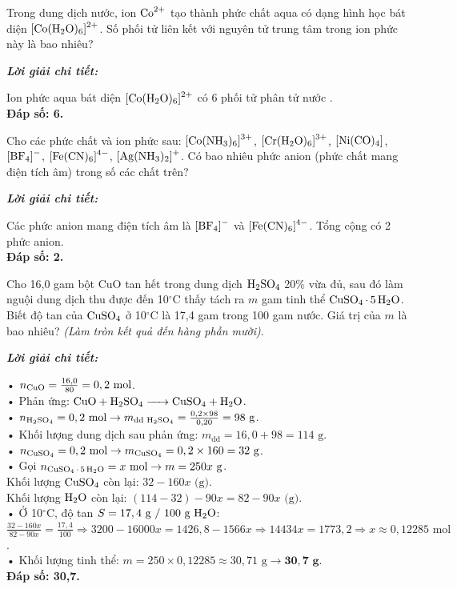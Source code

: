 \documentclass[11pt,a4paper]{article}
\def\loigiai#1{
\par\begingroup\color{blue!80!black}\small
\noindent\textbf{\textit{Lời giải chi tiết:}}\par
#1\par\endgroup}
\begin{document}
\begin{ex}
Trong dung dịch nước, ion $\ce{Co^2+}$ tạo thành phức chất aqua có dạng hình học bát diện $\ce{[Co(H2O)6]^2+}$. Số phối tử liên kết với nguyên tử trung tâm trong ion phức này là bao nhiêu?
\loigiai{
Ion phức aqua bát diện $\ce{[Co(H2O)6]^2+}$ có 6 phối tử phân tử nước \ce{H2O}.\\
\textbf{Đáp số: 6.}}
\end{ex}


\begin{ex}
Cho các phức chất và ion phức sau: $\ce{[Co(NH3)6]^3+}$, $\ce{[Cr(H2O)6]^3+}$, $\ce{[Ni(CO)4]}$, $\ce{[BF4]-}$, $\ce{[Fe(CN)6]^4-}$, $\ce{[Ag(NH3)2]+}$. Có bao nhiêu phức anion (phức chất mang điện tích âm) trong số các chất trên?
\loigiai{
Các phức anion mang điện tích âm là $\ce{[BF4]-}$ và $\ce{[Fe(CN)6]^4-}$. Tổng cộng có 2 phức anion.\\
\textbf{Đáp số: 2.}}
\end{ex}


\begin{ex}
Cho 16,0 gam bột CuO tan hết trong dung dịch $\ce{H2SO4}$ 20\% vừa đủ, sau đó làm nguội dung dịch thu được đến 10$^\circ$C thấy tách ra $m$ gam tinh thể $\ce{CuSO4.5H2O}$. Biết độ tan của $\ce{CuSO4}$ ở 10$^\circ$C là 17,4 gam trong 100 gam nước. Giá trị của $m$ là bao nhiêu? \textit{(Làm tròn kết quả đến hàng phần mười)}.
\loigiai{
• $n_{\ce{CuO}} = \frac{16,0}{80} = 0,2\text{ mol}$.\\
• Phản ứng: $\ce{CuO + H2SO4 -> CuSO4 + H2O}$.\\
• $n_{\ce{H2SO4}} = 0,2\text{ mol} \rightarrow m_{\text{dd }\ce{H2SO4}} = \frac{0,2 \times 98}{0,20} = 98\text{ g}$.\\
• Khối lượng dung dịch sau phản ứng: $m_{\text{dd}} = 16,0 + 98 = 114\text{ g}$.\\
• $n_{\ce{CuSO4}} = 0,2\text{ mol} \rightarrow m_{\ce{CuSO4}} = 0,2 \times 160 = 32\text{ g}$.\\
• Gọi $n_{\ce{CuSO4.5H2O}} = x\text{ mol} \rightarrow m = 250x\text{ g}$.\\
  Khối lượng $\ce{CuSO4}$ còn lại: $32 - 160x\text{ (g)}$.\\
  Khối lượng $\ce{H2O}$ còn lại: $(114 - 32) - 90x = 82 - 90x\text{ (g)}$.\\
• Ở 10$^\circ$C, độ tan $S = 17,4\text{ g / 100 g }\ce{H2O}$:\\
  $\frac{32 - 160x}{82 - 90x} = \frac{17,4}{100} \Rightarrow 3200 - 16000x = 1426,8 - 1566x \Rightarrow 14434x = 1773,2 \Rightarrow x \approx 0,12285\text{ mol}$.\\
• Khối lượng tinh thể: $m = 250 \times 0,12285 \approx 30,71\text{ g} \rightarrow \mathbf{30,7\text{ g}}$.\\
\textbf{Đáp số: 30,7.}}
\end{ex}
\end{document}
